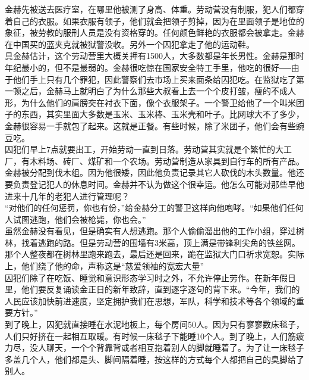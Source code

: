 金赫先被送去医疗室，在哪里他被测了身高、体重。劳动营没有制服，犯人们都穿着自己的衣服。如果衣服有领子，他们就会把领子剪掉，因为在里面领子是地位的象征，被劳教的服刑人员是没有资格穿的。任何颜色鲜艳的衣服都会被拿走。金赫在中国买的蓝夹克就被狱警没收。另外一个囚犯拿走了他的运动鞋。\\

具金赫估计，这个劳动营里大概关押有1500人，大多数都是年长男性。金赫是那时年纪最小的，但不是最弱的。金赫很吃惊在国家安全特工手里，他吃的很好──由于他们手上只有几个罪犯，因此警察们去市场上买来面条给囚犯吃。在监狱吃了第一顿之后，金赫马上就明白了为什么那些大叔看上去一个个皮打皱，瘦的不成人形，为什么他们的肩膀突在衬衣下面，像个衣服架子。一个警卫给他了一个叫米团子的东西，其实里面大多数是玉米、玉米棒、玉米壳和叶子。比网球大不了多少，金赫很容易一手就包了起来。这就是正餐。有些时候，除了米团子，他们会有些豌豆吃。\\

囚犯们早上7点就要出工，开始劳动一直到日落。劳动营其实就是个繁忙的大工厂，有木料场、砖厂、煤矿和一个农场。劳动营制造从家具到自行车的所有产品。金赫被分配到伐木组。因为他很矮，因此他负责记录其它人砍伐的木头数量。他还要负责登记犯人的休息时间。金赫并不认为做这个很幸运。他怎么可能对那些早他进来十几年的老犯人进行管理呢？\\

“对他们的任何惩罚，你也有份，”给金赫分工的警卫这样向他咆哮。“如果他们任何人试图逃跑，他们会被枪毙，你也会。”\\

虽然金赫没有看见，但是确实有人想逃跑。那个人偷偷溜出他的工作小组，穿过树林，找着逃跑的路。但是劳动营的围墙有3米高，顶上满是带锋利尖角的铁丝网。那个人整夜都在树林里跑来跑去，最后还是回来，跪在监狱大门口祈求宽恕。实际上，他们绕了他的命，声称这是“慈爱领袖的宽宏大量”\\

囚犯们除了在吃饭、睡觉和意识形态学习时之外，不允许停止劳作。在新年假日里，他们要反复诵读金正日的新年致辞，直到逐字逐句的背下来。“今年，我们的人民应该加快前进速度，坚定拥护我们在思想，军队，科学和技术等各个领域的重要方针。”\\

到了晚上，囚犯就直接睡在水泥地板上，每个房间50人。因为只有寥寥数床毯子，人们只好挤在一起相互取暖。有时候一床毯子下能睡10个人。到了晚上，人们筋疲力尽，没人聊天，一个个背靠背或者相互抱着别人的脚就睡着了。为了让一床毯子多盖几个人，他们都是头、脚间隔着睡，按这样的方式每个人都把自己的臭脚给了别人。\\

